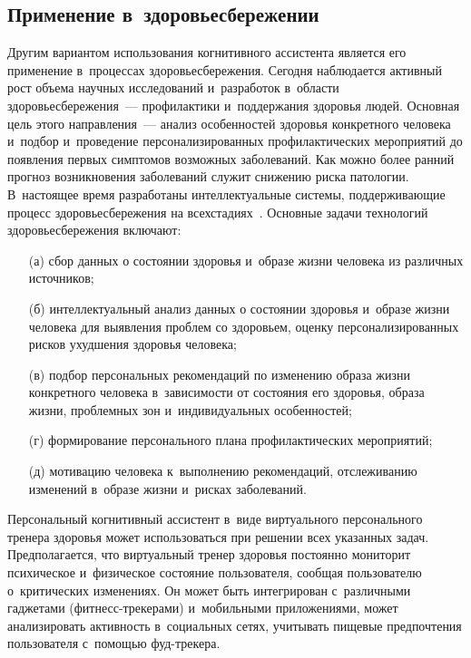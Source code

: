 \begin{multicols}{2}
\section{Применение в~здоровьесбережении}

  Другим вариантом использования когнитивного ассистента является его 
применение в~процессах здоровьесбережения. Сегодня наблюдается активный 
рост объема научных исследований и~разработок в~области 
здоровьесбережения~--- профилактики и~поддержания здоровья людей. 
Основная цель этого направления~--- анализ особенностей здоровья 
конкретного человека и~подбор и~проведение персонализированных 
профилактических мероприятий до появления первых симптомов возможных 
заболеваний. Как можно более ранний\linebreak
 прогноз возникновения заболеваний 
служит снижению риска патологии. В~настоящее время разработаны 
интеллектуальные системы, под\-дер\-жи\-вающие процесс здоровьесбережения на 
всех\linebreak стадиях~\cite{14-sm}. Основные задачи технологий здоровьесбережения 
включают: 
  \begin{itemize}
  \item [(а)] сбор данных о состоянии здоровья и~образе жизни человека из 
различных источников;
  \item[(б)] интеллектуальный анализ данных о состоянии здоровья и~образе 
жизни человека для выявления проблем со здоровьем, оценку 
персонализированных рисков ухудшения здоровья человека;
  \item[(в)] подбор персональных рекомендаций по изменению образа жизни 
конкретного человека в~зависимости от состояния его здоровья, образа жизни, 
проблемных зон и~индивидуальных особенностей;
  \item[(г)] формирование персонального плана профилактических 
мероприятий;
  \item[(д)] мотивацию человека к~выполнению рекомендаций, отслеживанию 
изменений в~образе жизни и~рисках заболеваний.
  \end{itemize}
  
  Персональный когнитивный ассистент в~виде виртуального персонального 
тренера здоровья может использоваться при решении всех указанных задач. 
Предполагается, что виртуальный тренер здоровья постоянно мониторит 
психическое и~физическое состояние пользователя, сообщая пользователю 
о~критических изменениях. Он может быть интегрирован с~различными 
гаджетами (фит\-несс-тре\-ке\-ра\-ми) и~мобильными приложениями, может 
анализировать активность в~социальных сетях, учитывать пищевые 
предпочтения пользователя с~помощью фуд-тре\-кера. 
  

\end{multicols}
